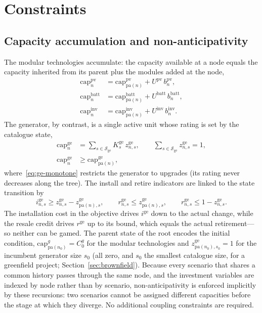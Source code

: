 \documentclass[11pt,a4paper]{article}
\theoremstyle{plain}
\theoremstyle{definition}
\newcommand{\pa}{\mathrm{pa}}
\begin{document}
\section{Constraints}
\label{sec:constraints}

\subsection{Capacity accumulation and non-anticipativity}
\label{sec:capacity}

The modular technologies accumulate: the capacity available at a node equals the capacity
inherited from its parent plus the modules added at the node,
\begin{align}
  \mathrm{cap}^{\mathrm{pv}}_n   &= \mathrm{cap}^{\mathrm{pv}}_{\pa(n)}
      + U^{\mathrm{pv}}\, b^{\mathrm{pv}}_n, \label{eq:cap-pv}\\
  \mathrm{cap}^{\mathrm{batt}}_n &= \mathrm{cap}^{\mathrm{batt}}_{\pa(n)}
      + U^{\mathrm{batt}}\, b^{\mathrm{batt}}_n, \label{eq:cap-batt}\\
  \mathrm{cap}^{\mathrm{inv}}_n  &= \mathrm{cap}^{\mathrm{inv}}_{\pa(n)}
      + U^{\mathrm{inv}}\, b^{\mathrm{inv}}_n. \label{eq:cap-inv}
\end{align}
The generator, by contrast, is a single active unit whose rating is set by the catalogue
state,
\begin{align}
  \mathrm{cap}^{\mathrm{ge}}_n &= \sum_{s\in\mathcal{S}_{\mathrm{ge}}}
      K^{\mathrm{ge}}_s\, z^{\mathrm{ge}}_{n,s},
  \qquad \sum_{s\in\mathcal{S}_{\mathrm{ge}}} z^{\mathrm{ge}}_{n,s}=1,
  \label{eq:cap-ge}\\
  \mathrm{cap}^{\mathrm{ge}}_n &\geq \mathrm{cap}^{\mathrm{ge}}_{\pa(n)},
  \label{eq:ge-monotone}
\end{align}
where~\eqref{eq:ge-monotone} restricts the generator to upgrades (its rating never
decreases along the tree). The install and retire indicators are linked to the state
transition by
\begin{equation}
  i^{\mathrm{ge}}_{n,s} \geq z^{\mathrm{ge}}_{n,s}-z^{\mathrm{ge}}_{\pa(n),s},
  \qquad
  r^{\mathrm{ge}}_{n,s} \leq z^{\mathrm{ge}}_{\pa(n),s},
  \qquad
  r^{\mathrm{ge}}_{n,s} \leq 1-z^{\mathrm{ge}}_{n,s}.
  \label{eq:ge-transition}
\end{equation}
The installation cost in the objective drives $i^{\mathrm{ge}}$ down to the actual
change, while the resale credit drives $r^{\mathrm{ge}}$ up to its bound, which
equals the actual retirement---so neither can be gamed. The parent state of the root
encodes the initial condition, $\mathrm{cap}^{g}_{\pa(n_0)}=C^{g}_0$ for the modular
technologies and $z^{\mathrm{ge}}_{\pa(n_0),s_0}=1$ for the incumbent generator size $s_0$
(all zero, and $s_0$ the smallest catalogue size, for a greenfield project;
Section~\ref{sec:brownfield}). Because every scenario that shares a common history passes
through the same node, and the investment variables are indexed by node rather than by
scenario, non-anticipativity is enforced implicitly by these recursions: two scenarios
cannot be assigned different capacities before the stage at which they diverge. No
additional coupling constraints are required.
\end{document}
